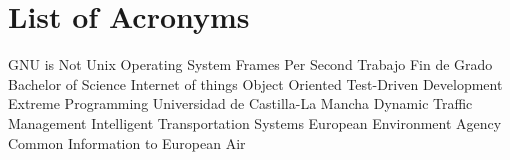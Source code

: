 \chapter{List of Acronyms} %

{\small
\begin{acronym}[XXXXXXXX]
	     	{\acs{GNU} is Not Unix}
			{Operating System}
			{Frames Per Second}
			{Trabajo Fin de Grado}
			{Bachelor of Science}
			{Internet of things}
			{Object Oriented}
			{Test-Driven Development}
			{Extreme Programming}
			{Universidad de Castilla-La Mancha}
			{Dynamic Traffic Management}
			{Intelligent Transportation Systems}
			{European Environment Agency}
		{Common Information to European Air}
\end{acronym}
}




